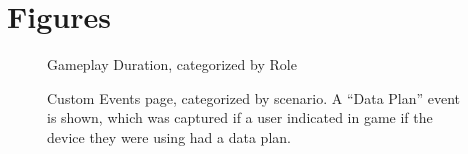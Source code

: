 \chapter{Figures}

\vspace*{-3in}

\begin{figure}[htb]
	\vspace{2.4in}
	\caption[Analytics Site: Gameplay Duration]{\label{fig:gameplay_duration} Gameplay Duration, categorized by Role}
\end{figure}
\clearpage
\newpage

\begin{figure}[htb]
	\vspace{2.4in}
	\caption[Analytics Site: Custom Events]{\label{fig:custom_events_ui} Custom Events page, categorized by scenario. A ``Data Plan'' event is shown, which was captured if a user indicated in game if the device they were using had a data plan.}
\end{figure}
\clearpage
\newpage

